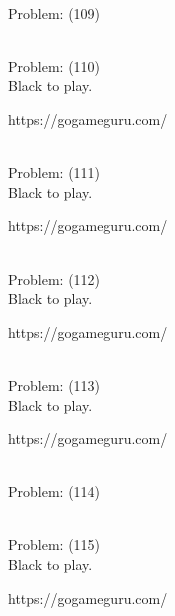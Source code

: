 \documentclass[11pt]{article}
\begin{document}
\begin{minipage}[t]{0.5\textwidth}
  {\centering
  
\\
Problem: (109)\\
  }
\end{minipage}
\begin{minipage}[t]{0.5\textwidth}
  {\centering
  
\\
Problem: (110)\\
Black to play.

https://gogameguru.com/\\
  }
\end{minipage}
\begin{minipage}[t]{0.5\textwidth}
  {\centering
  
\\
Problem: (111)\\
Black to play.

https://gogameguru.com/\\
  }
\end{minipage}
\begin{minipage}[t]{0.5\textwidth}
  {\centering
  
\\
Problem: (112)\\
Black to play.

https://gogameguru.com/\\
  }
\end{minipage}
\begin{minipage}[t]{0.5\textwidth}
  {\centering
  
\\
Problem: (113)\\
Black to play.

https://gogameguru.com/\\
  }
\end{minipage}
\begin{minipage}[t]{0.5\textwidth}
  {\centering
  
\\
Problem: (114)\\
  }
\end{minipage}
\begin{minipage}[t]{0.5\textwidth}
  {\centering
  
\\
Problem: (115)\\
Black to play.

https://gogameguru.com/\\
  }
\end{minipage}
\end{document}
